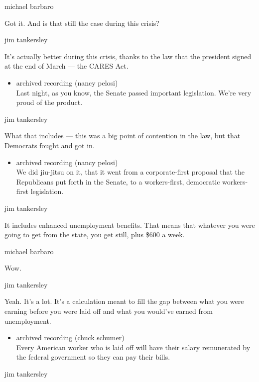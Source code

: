 michael barbaro

Got it. And is that still the case during this crisis?

jim tankersley

It's actually better during this crisis, thanks to the law that the
president signed at the end of March --- the CARES Act.

\begin{itemize}
\tightlist
\item
  archived recording (nancy pelosi)\\
  Last night, as you know, the Senate passed important legislation.
  We're very proud of the product.
\end{itemize}

jim tankersley

What that includes --- this was a big point of contention in the law,
but that Democrats fought and got in.

\begin{itemize}
\tightlist
\item
  archived recording (nancy pelosi)\\
  We did jiu-jitsu on it, that it went from a corporate-first proposal
  that the Republicans put forth in the Senate, to a workers-first,
  democratic workers-first legislation.
\end{itemize}

jim tankersley

It includes enhanced unemployment benefits. That means that whatever you
were going to get from the state, you get still, plus \$600 a week.

michael barbaro

Wow.

jim tankersley

Yeah. It's a lot. It's a calculation meant to fill the gap between what
you were earning before you were laid off and what you would've earned
from unemployment.

\begin{itemize}
\tightlist
\item
  archived recording (chuck schumer)\\
  Every American worker who is laid off will have their salary
  remunerated by the federal government so they can pay their bills.
\end{itemize}

jim tankersley


